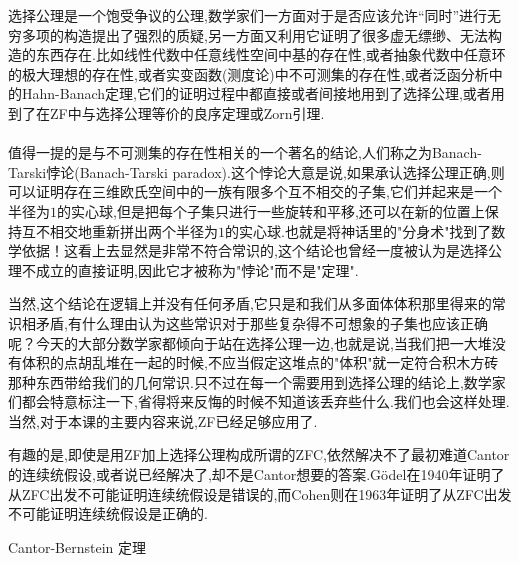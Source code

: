 \begin{frame}
选择公理是一个饱受争议的公理,数学家们一方面对于是否应该允许“同时”进行无穷多项的构造提出了强烈的质疑,另一方面又利用它证明了很多虚无缥缈、无法构造的东西存在.比如线性代数中任意线性空间中基的存在性,或者抽象代数中任意环的极大理想的存在性,或者实变函数(测度论)中不可测集的存在性,或者泛函分析中的Hahn-Banach定理,它们的证明过程中都直接或者间接地用到了选择公理,或者用到了在ZF中与选择公理等价的良序定理或Zorn引理.
\\ \hspace*{\fill} \\%
值得一提的是与不可测集的存在性相关的一个著名的结论,人们称之为\alert{Banach-Tarski悖论}(Banach-Tarski paradox).这个悖论大意是说,如果承认选择公理正确,则可以证明存在三维欧氏空间中的一族有限多个互不相交的子集,它们并起来是一个半径为$1$的实心球,但是把每个子集只进行一些旋转和平移,还可以在新的位置上保持互不相交地重新拼出两个半径为$1$的实心球.也就是将神话里的"分身术"找到了数学依据！这看上去显然是非常不符合常识的,这个结论也曾经一度被认为是选择公理不成立的直接证明,因此它才被称为"悖论"而不是"定理".
\end{frame}


\begin{frame}
当然,这个结论在逻辑上并没有任何矛盾,它只是和我们从多面体体积那里得来的常识相矛盾,有什么理由认为这些常识对于那些复杂得不可想象的子集也应该正确呢？今天的大部分数学家都倾向于站在选择公理一边,也就是说,当我们把一大堆没有体积的点胡乱堆在一起的时候,不应当假定这堆点的"体积"就一定符合积木方砖那种东西带给我们的几何常识.只不过在每一个需要用到选择公理的结论上,数学家们都会特意标注一下,省得将来反悔的时候不知道该丢弃些什么.我们也会这样处理.当然,对于本课的主要内容来说,ZF已经足够应用了.

\end{frame}

\begin{frame}
有趣的是,即使是用ZF加上选择公理构成所谓的ZFC,依然解决不了最初难道Cantor的连续统假设,或者说已经解决了,却不是Cantor想要的答案.Gödel在1940年证明了从ZFC出发不可能证明连续统假设是错误的,而Cohen则在1963年证明了从ZFC出发不可能证明连续统假设是正确的.
\end{frame}

\begin{frame}{Cantor-Bernstein 定理}
	
\end{frame}

